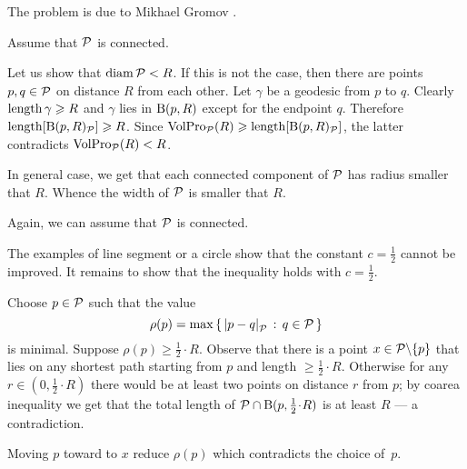 \medskip

The problem is due to Mikhael Gromov \cite[Appendix 1(E$_{2}$)]{gromov-1983}.




Assume that $\mathcal{P}$ is connected.

Let us show that $\operatorname{\rm diam}\nolimits\mathcal{P}<R$.
If this is not the case, then there are points $p,q\in\mathcal{P}$ on distance $R$ from each other.
Let $\gamma$ be a geodesic from $p$ to $q$.
Clearly $\mathop{\rm length}\nolimits\gamma\geqslant R$ and $\gamma$ lies in $\mathrm{B}{}(p,R)$ except for the endpoint $q$.
Therefore $\mathop{\rm length}\nolimits[\mathrm{B}{}(p,R)_{\mathcal{P}}]\geqslant R$.
Since $\VolPro_{\spc{P}}(R)\z\ge \length[\oBall(p,R)_{\spc{P}}]$,
the latter contradicts $\operatorname{\rm VolPro}\nolimits_{\mathcal{P}}(R)<R$.

In general case, we get that each connected component of $\mathcal{P}$ has radius smaller that $R$.
Whence the width of $\mathcal{P}$ is smaller that $R$.

 Again, we can assume that $\mathcal{P}$ is connected.

The examples of line segment or a circle show that the constant $c=\tfrac12$ cannot be improved.
It remains to show that the inequality holds with $c=\tfrac12$.

Choose $p\in\mathcal{P}$ such that the value
\[\rho(p)=\max\set{\dist{p}{q}{\spc{P}}}{q\in\spc{P}}\]
is minimal.
Suppose $\rho(p)\ge\tfrac 12\cdot R$.
Observe that there is a point $x\in \mathcal{P}\backslash\{p\}$ that lies on any shortest path starting from $p$ and length $\ge\tfrac 12\cdot R$.
Otherwise for any $r\in(0,\tfrac 12\cdot R)$ there would be at least two points on distance $r$ from $p$;
by coarea inequality we get that the total length of $\spc{P}\cap \oBall(p,\tfrac 12\cdot R)$ is at least $R$ --- a contradiction.

Moving $p$ toward to $x$ reduce $\rho(p)$ which contradicts the choice of~$p$.



